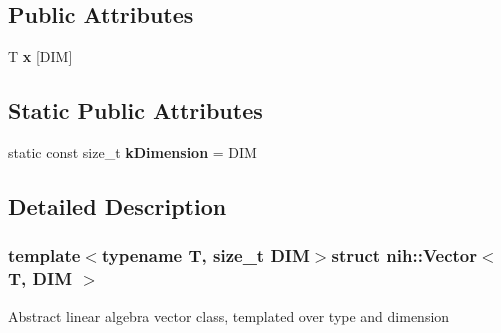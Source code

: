 \subsection*{\-Public \-Attributes}
\begin{DoxyCompactItemize}
\item 
\hypertarget{structnih_1_1_vector_a810f03d87064e81f7836bb149fe1f4d3}{
\-T {\bfseries x} \mbox{[}\-D\-I\-M\mbox{]}}
\label{structnih_1_1_vector_a810f03d87064e81f7836bb149fe1f4d3}

\end{DoxyCompactItemize}
\subsection*{\-Static \-Public \-Attributes}
\begin{DoxyCompactItemize}
\item 
\hypertarget{structnih_1_1_vector_a5390e172ebc4e60c329c6ac95c603286}{
static const size\-\_\-t {\bfseries k\-Dimension} = \-D\-I\-M}
\label{structnih_1_1_vector_a5390e172ebc4e60c329c6ac95c603286}

\end{DoxyCompactItemize}


\subsection{\-Detailed \-Description}
\subsubsection*{template$<$typename \-T, size\-\_\-t \-D\-I\-M$>$struct nih\-::\-Vector$<$ T, D\-I\-M $>$}

\-Abstract linear algebra vector class, templated over type and dimension 

